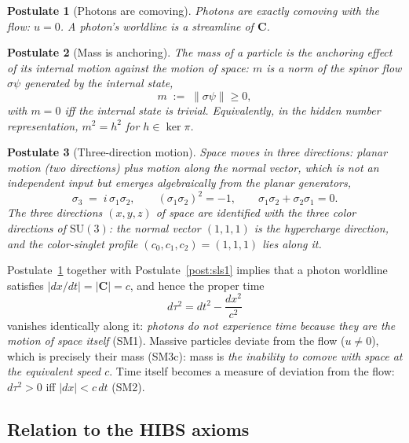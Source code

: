 \documentclass[aps,prd,preprint,superscriptaddress,amsmath,amssymb]{revtex4-2}
\newtheorem{postulate}{Postulate}[section]
\begin{document}
\begin{postulate}[Photons are comoving]
\label{post:sls2}
Photons are exactly comoving with the flow: $u=0$.  A photon's worldline is
a streamline of $\bm{C}$.
\end{postulate}

\begin{postulate}[Mass is anchoring]
\label{post:mc1}
The mass of a particle is the \emph{anchoring effect} of its internal motion
against the motion of space: $m$ is a norm of the spinor flow $\sigma\psi$
generated by the internal state,
\begin{equation}
m \;:=\; \|\sigma\psi\| \geq 0,
\end{equation}
with $m=0$ iff the internal state is trivial.  Equivalently, in the hidden
number representation, $m^2 = h^2$ for $h\in\ker\pi$.
\end{postulate}

\begin{postulate}[Three-direction motion]
\label{post:three}
Space moves in three directions: planar motion (two directions) plus motion
along the normal vector, which is \emph{not} an independent input but
emerges algebraically from the planar generators,
\begin{equation}
\sigma_3 \;=\; i\,\sigma_1\sigma_2,
\qquad
(\sigma_1\sigma_2)^2 = -1,
\qquad
\sigma_1\sigma_2 + \sigma_2\sigma_1 = 0 .
\end{equation}
The three directions $(x,y,z)$ of space are identified with the three color
directions of $\mathrm{SU}(3)$: the normal vector $(1,1,1)$ is the
hypercharge direction, and the color-singlet profile $(c_0,c_1,c_2)=(1,1,1)$
lies along it.
\end{postulate}

Postulate~\ref{post:sls2} together with Postulate~\ref{post:sls1} implies
that a photon worldline satisfies $|dx/dt|=|\bm{C}|=c$, and hence the
proper time
\begin{equation}
d\tau^2 = dt^2 - \frac{dx^2}{c^2}
\end{equation}
vanishes identically along it: \emph{photons do not experience time because
they are the motion of space itself} (SM1).  Massive particles deviate from
the flow ($u\neq 0$), which is precisely their mass (SM3c): mass is
\emph{the inability to comove with space at the equivalent speed $c$}.
Time itself becomes a measure of deviation from the flow:
$d\tau^2>0$ iff $|dx|<c\,dt$ (SM2).

\subsection{Relation to the HIBS axioms}
\end{document}
